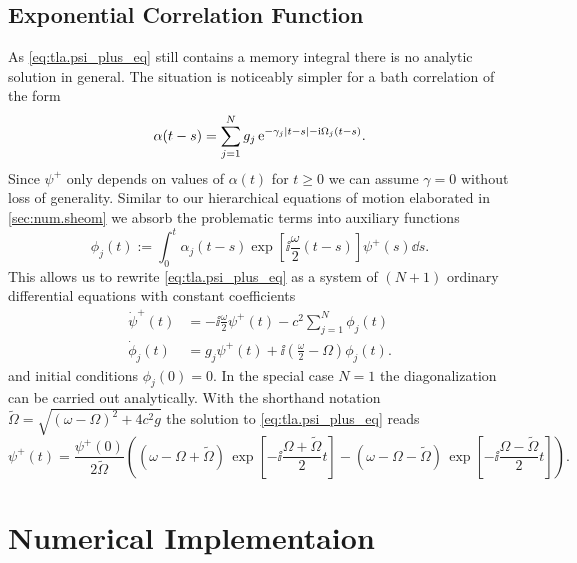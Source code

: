 \section{Exponential Correlation Function}
\label{sec:tla.exp}

As \autoref{eq:tla.psi_plus_eq} still contains a memory integral there is no analytic solution in general.
The situation is noticeably simpler for a bath correlation of the form
\begin{equation}
  \alpha(t - s) = \sum_{j=1}^N g_j \, \exp[-\gamma_j \abs{t - s} - \ii \Omega_j (t - s)].
  \label{eq:tla.exp_alpha}
\end{equation}
Since $\psi^+$ only depends on values of $\alpha(t)$ for $t \ge 0$ we can assume $\gamma = 0$ without loss of generality.
Similar to our hierarchical equations of motion elaborated in \autoref{sec:num.sheom} we absorb the problematic terms into auxiliary functions
\begin{equation}
  \phi_j(t) := \int_0^t \alpha_j(t-s) \exp[\ii \frac{\omega}{2}(t-s)] \psi^+(s) \dd s.
  \label{eq:tla.auxiliary}
\end{equation}
This allows us to rewrite \autoref{eq:tla.psi_plus_eq} as a system of $(N+1)$ ordinary differential equations with constant coefficients
\begin{align*}
  \dot\psi^+(t) &= -\ii \frac{\omega}{2} \psi^+(t) - c^2 \sum_{j=1}^N \phi_j(t) \\
  \dot\phi_j(t) &= g_j \psi^+(t) + \ii \left( \frac{\omega}{2} - \Omega \right) \phi_j(t).
\end{align*}
and initial conditions $\phi_j(0) = 0$.
In the special case $N = 1$ the diagonalization can be carried out analytically.
With the shorthand notation $\tilde\Omega = \sqrt{(\omega - \Omega)^2 + 4c^2 g}$ the solution to \autoref{eq:tla.psi_plus_eq} reads
\begin{equation}
  \psi^+(t) = \frac{\psi^+(0)}{2\tilde\Omega} \left( (\omega - \Omega + \tilde\Omega) \, \exp[-\ii \frac{\Omega + \tilde\Omega}{2} t ]  -  (\omega - \Omega - \tilde\Omega) \, \exp[-\ii \frac{\Omega - \tilde\Omega}{2} t ] \right).
  \label{eq:tla.solution}
\end{equation}

%

\chapter{Numerical Implementaion}
\label{cha:implement}

